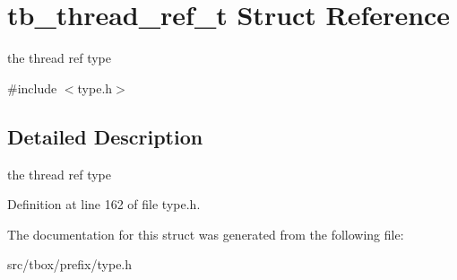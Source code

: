 \hypertarget{structtb__thread__ref__t}{\section{tb\-\_\-thread\-\_\-ref\-\_\-t Struct Reference}
\label{structtb__thread__ref__t}
}


the thread ref type  




{\ttfamily \#include $<$type.\-h$>$}



\subsection{Detailed Description}
the thread ref type 

Definition at line 162 of file type.\-h.



The documentation for this struct was generated from the following file\-:\begin{DoxyCompactItemize}
\item 
src/tbox/prefix/type.\-h\end{DoxyCompactItemize}
